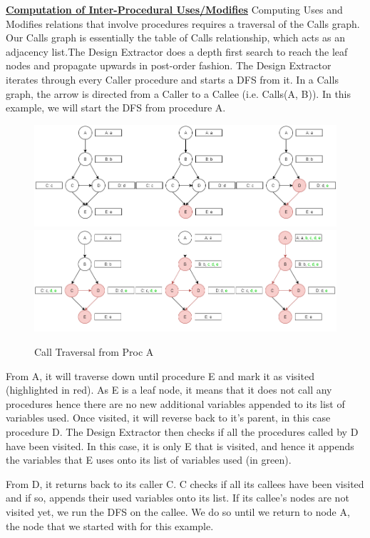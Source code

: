 \documentclass[12pt]{article}
\begin{document}
{{{{{{{{{{\textbf{\underline{Computation of Inter-Procedural Uses/Modifies}}\newline
Computing Uses and Modifies relations that involve procedures requires a traversal of the Calls graph. Our Calls graph is essentially the table of Calls relationship, which acts as an adjacency list.The Design Extractor does a depth first search to reach the leaf nodes and propagate upwards in post-order fashion.
The Design Extractor iterates through every Caller procedure and starts a DFS from it. In a Calls graph, the arrow is directed from a Caller to a Callee (i.e. Calls(A, B)). 
\newline In this example, we will start the DFS from procedure A. 
\begin{figure}[htbp]
  \caption{Call Traversal from Proc A}
  \centering  \includegraphics[width=1.0\textwidth]{Call_Traversal.png}
 \includegraphics[width=1.0\textwidth]{Call_Traversal_2.png}
\end{figure}
\vspace{4mm}
From A, it will traverse down until procedure E and mark it as visited (highlighted in red). As E is a leaf node, it means that it does not call any procedures hence there are no new additional variables appended to its list of variables used. Once visited, it will reverse back to it’s parent, in this case procedure D. The Design Extractor then checks if all the procedures called by D have been visited. In this case, it is only E that is visited, and hence it appends the variables that E uses onto its list of variables used (in green).

From D, it returns back to its caller C. C checks if all its callees have been visited and if so, appends their used variables onto its list. If its callee’s nodes are not visited yet, we run the DFS on the callee. We do so until we return to node A, the node that we started with for this example.

}}}}}}}}}}
\end{document}
